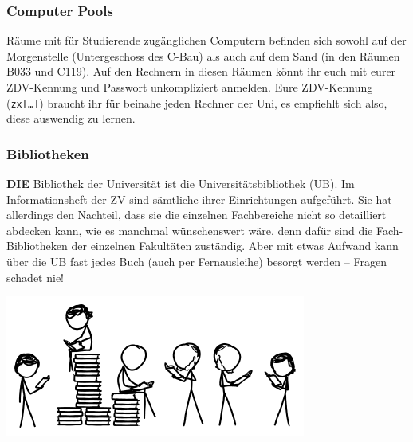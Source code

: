 \subsubsection*{Computer Pools}
Räume mit für Studierende zugänglichen Computern befinden sich sowohl auf der Morgenstelle (Untergeschoss des C-Bau) als auch auf dem Sand (in den Räumen B033 und C119). Auf den Rechnern in diesen Räumen könnt ihr euch mit eurer ZDV-Kennung und Passwort unkompliziert anmelden. Eure ZDV-Kennung (\texttt{zx[…]}) braucht ihr für beinahe jeden Rechner der Uni, es empfiehlt sich also, diese auswendig zu lernen. 

\subsubsection*{Bibliotheken}
\textbf{DIE} Bibliothek der Universität ist die
Universitätsbibliothek (UB).  Im Informationsheft der ZV sind
sämtliche ihrer Einrichtungen auf\-ge\-führt.  Sie hat
allerdings den Nachteil, dass sie die einzelnen Fachbereiche nicht so
detailliert abdecken kann, wie es manchmal wünschenswert wäre,
denn dafür sind die Fach-Bibliotheken der einzelnen Fakultäten
zuständig.  Aber mit etwas Aufwand kann über die UB fast jedes Buch
(auch per Fernausleihe) besorgt werden -- Fragen schadet nie!

\begin{center}
\includegraphics[width=0.45\hsize]{shared/xkcd/books_toomany.png}
\end{center}

